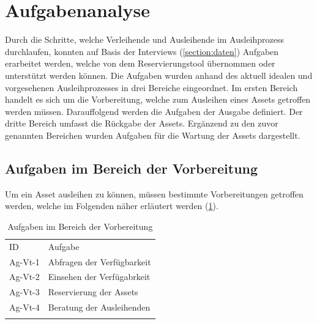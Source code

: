 \section{Aufgabenanalyse}
\label{section:aufgaben}
Durch die Schritte, welche Verleihende und Ausleihende im Ausleihprozess
durchlaufen, konnten auf Basis der Interviews (\ref{section:daten}) Aufgaben
erarbeitet werden, welche von dem Reservierungstool übernommen oder unterstützt
werden können. Die Aufgaben wurden anhand des aktuell idealen und vorgesehenen
Ausleihprozesses in drei Bereiche eingeordnet. Im ersten Bereich handelt es sich
um die Vorbereitung, welche zum Ausleihen eines Assets getroffen werden müssen.
Darauffolgend werden die Aufgaben der Ausgabe definiert. Der dritte Bereich
umfasst die Rückgabe der Assets. Ergänzend zu den zuvor genannten Bereichen
wurden Aufgaben für die Wartung der Assets dargestellt.

\subsection{Aufgaben im Bereich der Vorbereitung}
Um ein Asset ausleihen zu können, müssen bestimmte Vorbereitungen getroffen
werden, welche im Folgenden näher erläutert werden (\ref{table:Ag-Vt}).

\begin{table}[h]
        \centering
        \caption{Aufgaben im Bereich der Vorbereitung}
        \begin{tabular}{ll}
                \arrayrulecolor{maincolor}\hline
                \sffamily\color{maincolor}ID & \sffamily\color{maincolor}Aufgabe
                \\
                \arrayrulecolor{maincolor}\hline
                Ag-Vt-1                      & Abfragen der Verfügbarkeit
                \\
                Ag-Vt-2                      & Einsehen der Verfügabrkeit
                \\
                Ag-Vt-3                      & Reservierung der Assets
                \\
                Ag-Vt-4                      & Beratung der Ausleihenden
                \\
                \arrayrulecolor{maincolor}\hline
        \end{tabular}
        \label{table:Ag-Vt}
\end{table}

